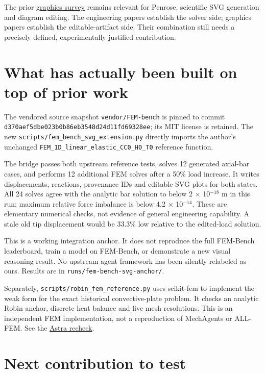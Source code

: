 \documentclass[
  11pt,
  a4paper,
]{article}
\begin{document}
The prior \href{../../reports/PRIOR_ART.md}{graphics survey} remains
relevant for Penrose, scientific SVG generation and diagram editing. The
engineering papers establish the solver side; graphics papers establish
the editable-artifact side. Their combination still needs a precisely
defined, experimentally justified contribution.

\section{What has actually been built on top of prior
work}\label{what-has-actually-been-built-on-top-of-prior-work}

The vendored source snapshot \texttt{vendor/FEM-bench} is pinned to
commit \nolinkurl{d370aef5dbe023b0b86eb3548d24d11fd69328ee}; its MIT
license is retained. The new
\nolinkurl{scripts/fem_bench_svg_extension.py} directly imports the
author's unchanged \nolinkurl{FEM_1D_linear_elastic_CC0_H0_T0} reference
function.

The bridge passes both upstream reference tests, solves 12 generated
axial-bar cases, and performs 12 additional FEM solves after a 50\% load
increase. It writes displacements, reactions, provenance IDs and
editable SVG plots for both states. All 24 solves agree with the
analytic bar solution to below 2 \(\times\) 10\(^{-18}\) m in this run;
maximum relative force imbalance is below 4.2 \(\times\) 10\(^{-14}\).
These are elementary numerical checks, not evidence of general
engineering capability. A stale old tip displacement would be 33.3\% low
relative to the edited-load solution.

This is a working integration anchor. It does not reproduce the full
FEM-Bench leaderboard, train a model on FEM-Bench, or demonstrate a new
visual reasoning result. No upstream agent framework has been silently
relabeled as ours. Results are in \texttt{runs/fem-bench-svg-anchor/}.

Separately, \nolinkurl{scripts/robin_fem_reference.py} uses scikit-fem
to implement the weak form for the exact historical convective-plate
problem. It checks an analytic Robin anchor, discrete heat balance and
five mesh resolutions. This is an independent FEM implementation, not a
reproduction of MechAgents or ALL-FEM. See the
\href{../../reports/ASTRA_FEM_FAILURE_RECHECK.md}{Astra recheck}.

\section{Next contribution to test}\label{next-contribution-to-test}
\end{document}
